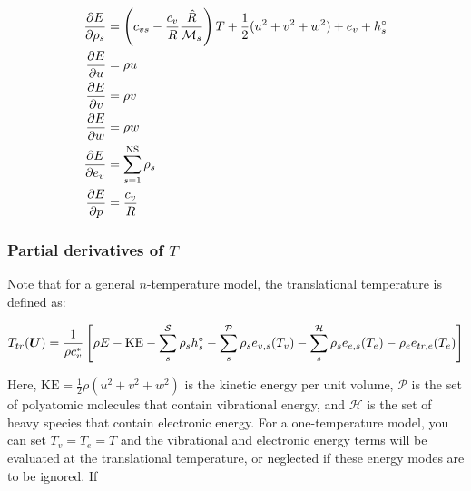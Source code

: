 \documentclass[10pt]{article}
\begin{document}
\begin{flushleft}
\begin{subequations}
    \begin{align}
        \frac{\partial E}{\partial \rho_s} &= \left( c_{vs} - \frac{c_v}{R} \frac{\hat{R}}{\mathcal{M}_s} \right)T + \frac{1}{2} (u^2 + v^2 + w^2) + e_v + h_s^\circ
        \\ \frac{\partial E}{\partial u} &= \rho u 
        \\ \frac{\partial E}{\partial v} &= \rho v
        \\ \frac{\partial E}{\partial w} &= \rho w
        \\ \frac{\partial E}{\partial e_v} &= \sum_{s=1}^\text{NS} \rho_s
        \\ \frac{\partial E}{\partial p} &= \frac{c_v}{R}
    \end{align}
\end{subequations}


\subsubsection{Partial derivatives of $T$}

Note that for a general $n$-temperature model, the translational temperature is defined as:

\begin{equation*}
    T_{tr}(\boldsymbol{U}) = \frac{1}{\rho c_v^*} \left[ \rho E - \text{KE} - \sum_s^\mathcal{S} \rho_s h_s^\circ - \sum_s^\mathcal{P} \rho_s e_{v,s} (T_v) - \sum_s^\mathcal{H} \rho_s e_{e,s} (T_e) - \rho_e e_{tr, e} (T_e) \right]
\end{equation*}

Here, $\text{KE} = \frac{1}{2} \rho (u^2 + v^2 + w^2)$ is the kinetic energy per unit volume, $\mathcal{P}$ is the set of polyatomic molecules that contain vibrational energy, and $\mathcal{H}$ is the set of heavy species that contain electronic energy. For a one-temperature model, you can set $T_v = T_e = T$ and the vibrational and electronic energy terms will be evaluated at the translational temperature, or neglected if these energy modes are to be ignored. If  


\end{flushleft}
\end{document}
